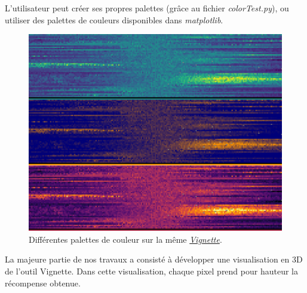 \documentclass[12pt]{article}
\begin{document}
L'utilisateur peut créer ses propres palettes (grâce au fichier \emph{colorTest.py}), ou utiliser des palettes de couleurs disponibles dans \emph{matplotlib}. \\

\begin{figure}[htp]
    \centering
    \includegraphics[width=15cm]{Images/palette}
    \caption{Différentes palettes de couleur sur la même \hyperref[fig:vignettePendulum]{\emph{Vignette}}.}
    \label{fig:palette}
\end{figure}

\newpage
La majeure partie de nos travaux a consisté à développer une visualisation en 3D de l'outil Vignette. Dans cette visualisation, chaque pixel prend pour hauteur la récompense obtenue. \\
\end{document}
